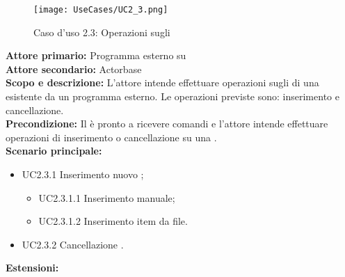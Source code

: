 \documentclass{scalatekids-article}
\begin{document}
\begin{figure}[H]
  \begin{center}
    \texttt{[image: UseCases/UC2\_3.png]}
    \caption*{Caso d'uso 2.3: Operazioni sugli }
  \end{center}
\end{figure}
\textbf{Attore primario:} Programma esterno su \\
\textbf{Attore secondario:} Actorbase\\
\textbf{Scopo e descrizione:} L'attore intende effettuare operazioni sugli  di una  esistente da un programma  esterno. Le operazioni previste sono:
inserimento e cancellazione.\\
\textbf{Precondizione:} Il  è pronto a ricevere comandi e l'attore intende effettuare operazioni di inserimento o cancellazione su una .\\
\textbf{Scenario principale:}
\begin{itemize}
\item UC2.3.1 Inserimento nuovo ;
  \begin{itemize}
  \item UC2.3.1.1 Inserimento  manuale;
  \item UC2.3.1.2 Inserimento  item da file.
  \end{itemize}
\item UC2.3.2 Cancellazione .
\end{itemize}
\textbf{Estensioni:}
\end{document}

